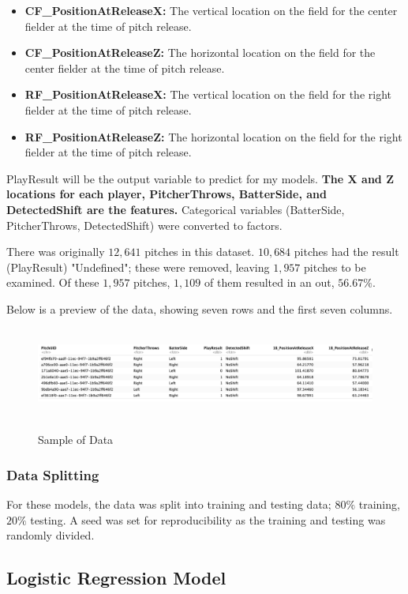 \documentclass{article}
\begin{document}
\begin{itemize}
    \item \textbf{CF\_PositionAtReleaseX:} The vertical location on the field for the center fielder at the time of pitch release.
    \item \textbf{CF\_PositionAtReleaseZ:} The horizontal location on the field for the center fielder at the time of pitch release.
    \item \textbf{RF\_PositionAtReleaseX:} The vertical location on the field for the right fielder at the time of pitch release.
    \item \textbf{RF\_PositionAtReleaseZ:} The horizontal location on the field for the right fielder at the time of pitch release.
\end{itemize}

PlayResult will be the output variable to predict for my models. \textbf{The X and Z locations for each player, PitcherThrows, BatterSide, and DetectedShift are the features.} Categorical variables (BatterSide, PitcherThrows, DetectedShift) were converted to factors. 

There was originally $12,641$ pitches in this dataset. $10,684$ pitches had the result (PlayResult) "Undefined"; these were removed, leaving $1,957$ pitches to be examined. Of these $1,957$ pitches, $1,109$ of them resulted in an out, $56.67\%$. 

Below is a preview of the data, showing seven rows and the first seven columns. 

\begin{figure}[h]
    \centering
    \includegraphics[height=3cm]{images/data_preview.png}
    \caption{Sample of Data}
    \cite{trackman2022}\cite{trackman2023}\cite{trackman2024}
\end{figure}

\subsubsection{Data Splitting}
For these models, the data was split into training and testing data; $80\%$ training, $20\%$ testing. A seed was set for reproducibility as the training and testing was randomly divided. 


\subsection{Logistic Regression Model}
\end{document}
